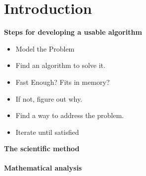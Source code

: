 
\chapter{Introduction}
\textbf{Steps for developing a usable algorithm}
\begin{itemize}
  \item Model the Problem
  \item Find an algorithm to solve it.
  \item Fast Enough? Fits in memory?
  \item If not, figure out why.
  \item Find a way to address the problem.
  \item Iterate until satisfied   
\end{itemize}
\textbf{The scientific method}\\\\
\textbf{Mathematical analysis}


